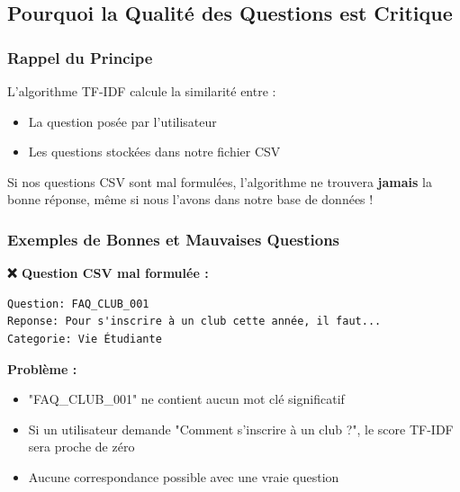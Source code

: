 \documentclass[11pt,a4paper]{article}
\begin{document}
\subsection{Pourquoi la Qualité des Questions est Critique}

\subsubsection{Rappel du Principe}

L'algorithme TF-IDF calcule la similarité entre :
\begin{itemize}
    \item La question posée par l'utilisateur
    \item Les questions stockées dans notre fichier CSV
\end{itemize}

\begin{important}
Si nos questions CSV sont mal formulées, l'algorithme ne trouvera \textbf{jamais} la bonne réponse, même si nous l'avons dans notre base de données !
\end{important}

\subsubsection{Exemples de Bonnes et Mauvaises Questions}

\begin{exemple}

\textbf{❌ Question CSV mal formulée :}

\begin{lstlisting}
Question: FAQ_CLUB_001
Reponse: Pour s'inscrire à un club cette année, il faut...
Categorie: Vie Étudiante
\end{lstlisting}

\textbf{Problème :} 
\begin{itemize}
    \item "FAQ\_CLUB\_001" ne contient aucun mot clé significatif
    \item Si un utilisateur demande "Comment s'inscrire à un club ?", le score TF-IDF sera proche de zéro
    \item Aucune correspondance possible avec une vraie question
\end{itemize}
\end{exemple}
\end{document}
